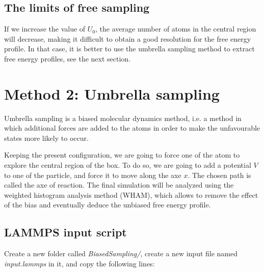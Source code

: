 \subsection{The limits of free sampling}

\noindent If we increase the value of $U_0$, the average number of
atoms in the central region will decrease, making it
difficult to obtain a good resolution for the free energy
profile.
In that case, it is better to use the umbrella sampling method
to extract free energy profiles, see the next section.

\section{Method 2: Umbrella sampling}

\noindent Umbrella sampling is a biased molecular dynamics method,
i.e. a method in which additional forces are added to the
atoms in order to make the unfavourable states more likely
to occur.

Keeping the present configuration, we are going to force one of the atom to
explore the central region of the box. To do so, we
are going to add a potential $V$ to one
of the particle, and force it to move along the axe $x$.
The chosen path is called the axe of reaction. The final
simulation will be analyzed using the weighted histogram
analysis method (WHAM), which allows to remove the effect of
the bias and eventually deduce the unbiased free energy profile.

\subsection{LAMMPS input script}

\noindent Create a new folder called \textit{BiasedSampling/}, create a new input file 
named \textit{input.lammps} in it, and copy the following lines:


